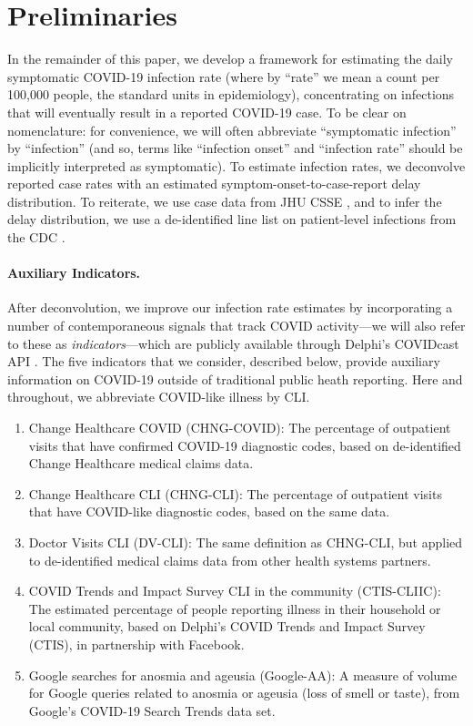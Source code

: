 \documentclass[sts]{imsart}
\theoremstyle{plain}
\theoremstyle{definition}
\theoremstyle{remark}
\begin{document}
\section{Preliminaries}
\label{sec:preliminaries}

In the remainder of this paper, we develop a framework for estimating the daily
symptomatic COVID-19 infection rate (where by ``rate'' we mean a count per
100,000 people, the standard units in epidemiology), concentrating on infections
that will eventually result in a reported COVID-19 case. To be clear on
nomenclature: for convenience, we will often abbreviate ``symptomatic
infection'' by ``infection'' (and so, terms like ``infection onset'' and
``infection rate'' should be implicitly interpreted as symptomatic). To
estimate infection rates, we deconvolve reported case rates with an estimated
symptom-onset-to-case-report delay distribution. To reiterate, we use case data
from JHU CSSE \citep{Dong:2020}, and to infer the delay distribution, we use a
de-identified line list on patient-level infections from the CDC
\citep{cdc_public}. 

\smallskip
\paragraph*{Auxiliary Indicators.}

After deconvolution, we improve our infection rate estimates by incorporating a
number of contemporaneous signals that track COVID activity---we will also 
refer to these as \emph{indicators}---which are publicly available through
Delphi's COVIDcast API \citep{Reinhart:2021}. The five indicators that we
consider, described below, provide auxiliary information on COVID-19 outside of 
traditional public heath reporting. Here and throughout, we abbreviate
COVID-like illness by CLI. 

\begin{enumerate}
\item Change Healthcare COVID (CHNG-COVID): The percentage of outpatient
  visits that have confirmed COVID-19 diagnostic codes, based on de-identified 
  Change Healthcare medical claims data. 
\item Change Healthcare CLI (CHNG-CLI): The percentage of outpatient visits that
  have COVID-like diagnostic codes, based on the same data.
\item Doctor Visits CLI (DV-CLI): The same definition as CHNG-CLI, but applied
  to de-identified medical claims data from other health systems partners. 
\item COVID Trends and Impact Survey CLI in the community
  (CTIS-CLIIC): The estimated percentage of people reporting  
  illness in their household or local community, based on Delphi's COVID
  Trends and Impact Survey (CTIS), in partnership with Facebook. 
\item Google searches for anosmia and ageusia (Google-AA): A measure of volume
  for Google queries related to anosmia or ageusia (loss of smell or taste),
  from Google's COVID-19 Search Trends data set. 
\end{enumerate}
\end{document}
